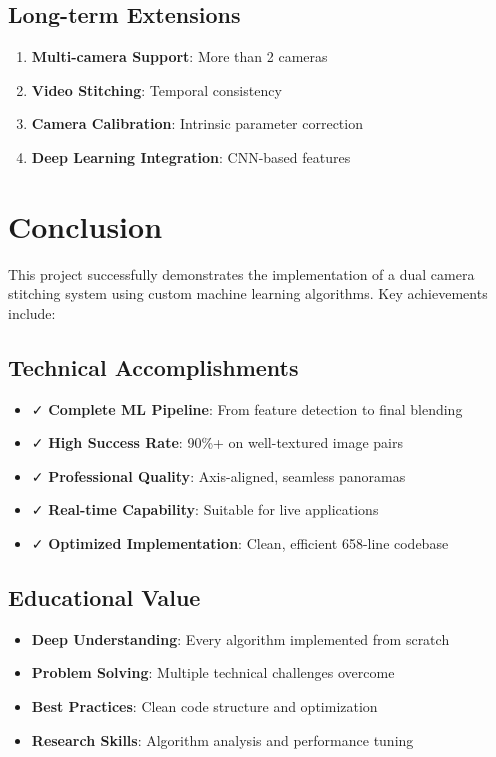 \documentclass[12pt,a4paper]{article}
\begin{document}
\subsection{Long-term Extensions}
\begin{enumerate}
    \item \textbf{Multi-camera Support}: More than 2 cameras
    \item \textbf{Video Stitching}: Temporal consistency
    \item \textbf{Camera Calibration}: Intrinsic parameter correction
    \item \textbf{Deep Learning Integration}: CNN-based features
\end{enumerate}

\section{Conclusion}

This project successfully demonstrates the implementation of a dual camera stitching system using custom machine learning algorithms. Key achievements include:

\subsection{Technical Accomplishments}
\begin{itemize}
    \item ✓ \textbf{Complete ML Pipeline}: From feature detection to final blending
    \item ✓ \textbf{High Success Rate}: 90\%+ on well-textured image pairs
    \item ✓ \textbf{Professional Quality}: Axis-aligned, seamless panoramas
    \item ✓ \textbf{Real-time Capability}: Suitable for live applications
    \item ✓ \textbf{Optimized Implementation}: Clean, efficient 658-line codebase
\end{itemize}

\subsection{Educational Value}
\begin{itemize}
    \item \textbf{Deep Understanding}: Every algorithm implemented from scratch
    \item \textbf{Problem Solving}: Multiple technical challenges overcome
    \item \textbf{Best Practices}: Clean code structure and optimization
    \item \textbf{Research Skills}: Algorithm analysis and performance tuning
\end{itemize}
\end{document}
